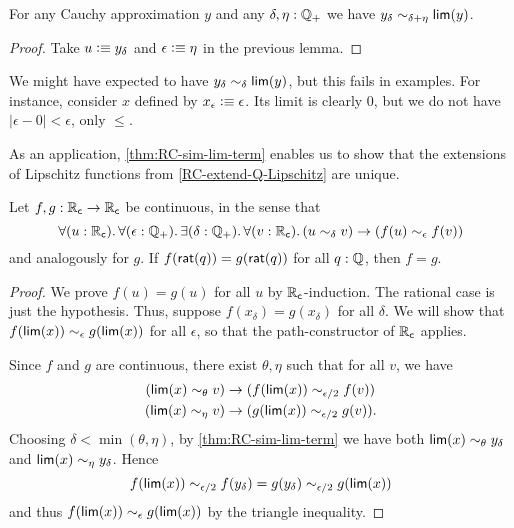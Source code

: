 \begin{lem}\label{thm:RC-sim-lim-term}
  For any Cauchy approximation $y$ and any $\delta,\eta:\mathbb{Q}_{+}$ we have $y_\delta \sim_{\delta+\eta} \mathsf{lim}(y)$.
\end{lem}
\begin{proof}
  Take $u\vcentcolon\equiv y_\delta$ and $\epsilon\vcentcolon\equiv \eta$ in the previous lemma.
\end{proof}

\begin{rmk}
  We might have expected to have $y_\delta \sim_{\delta} \mathsf{lim}(y)$, but this fails in examples.
  For instance, consider $x$ defined by $x_\epsilon \vcentcolon\equiv \epsilon$.
  Its limit is clearly $0$, but we do not have $|\epsilon - 0 |<\epsilon$, only $\le$.
\end{rmk}

As an application, \autoref{thm:RC-sim-lim-term} enables us to show that the extensions of Lipschitz functions from \autoref{RC-extend-Q-Lipschitz} are unique.

\begin{lem}\label{RC-continuous-eq}
  Let $f,g:\mathbb{R}_\mathsf{c}\to\mathbb{R}_\mathsf{c}$ be continuous, in the sense that
  \[ \fall{u:\RC}{\epsilon:\Qp}\exis{\delta:\Qp}\fall{v:\RC} (u\close\delta v) \to (f(u) \close\epsilon f(v)) \]
  and analogously for $g$.
  If $f(\mathsf{rat}(q))=g(\mathsf{rat}(q))$ for all $q:\mathbb{Q}$, then $f=g$.
\end{lem}
\begin{proof}
  We prove $f(u)=g(u)$ for all $u$ by $\mathbb{R}_\mathsf{c}$-induction.
  The rational case is just the hypothesis.
  Thus, suppose $f(x_\delta)=g(x_\delta)$ for all $\delta$.
  We will show that $f(\mathsf{lim}(x))\sim_{\epsilon} g(\mathsf{lim}(x))$ for all $\epsilon$, so that the path-constructor of $\mathbb{R}_\mathsf{c}$ applies.

  Since $f$ and $g$ are continuous, there exist $\theta,\eta$ such that for all $v$, we have
  \begin{align*}
    (\mathsf{lim}(x)\sim_{\theta} v) &\to (f(\mathsf{lim}(x)) \sim_{\epsilon/2} f(v))\\
    (\mathsf{lim}(x)\sim_{\eta} v) &\to (g(\mathsf{lim}(x)) \sim_{\epsilon/2} g(v)).
  \end{align*}
  Choosing $\delta < \min(\theta,\eta)$, by \autoref{thm:RC-sim-lim-term} we have both $\mathsf{lim}(x)\sim_{\theta} y_\delta$ and $\mathsf{lim}(x)\sim_{\eta} y_\delta$.
  Hence
  \[ f(\mathsf{lim}(x)) \sim_{\epsilon/2} f(y_\delta) = g(y_\delta) \sim_{\epsilon/2} g(\mathsf{lim}(x))\]
  and thus $f(\mathsf{lim}(x))\sim_{\epsilon} g(\mathsf{lim}(x))$ by the triangle inequality.
\end{proof}

